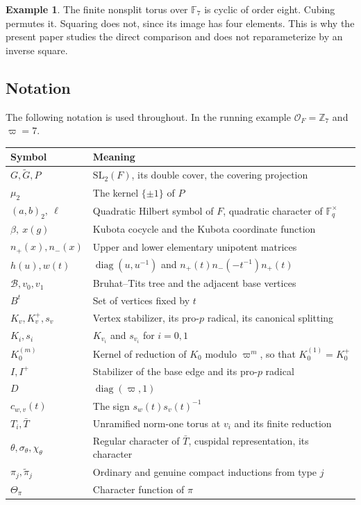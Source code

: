 \documentclass[12pt,letterpaper]{article}
\numberwithin{equation}{section}
\theoremstyle{definition}
\newtheorem{example}[theorem]{Example}
\theoremstyle{remark}
\newcommand{\OO}{\mathcal O_F}
\newcommand{\kk}{\mathbb F_q}
\newcommand{\Mp}{\widetilde G}
\newcommand{\diag}{\operatorname{diag}}
\newcommand{\BT}{\mathscr B}
\newcommand{\np}{n_{+}}
\newcommand{\nm}{n_{-}}
\begin{document}
\begin{example}
The finite nonsplit torus over $\mathbb F_7$ is cyclic of order eight. Cubing permutes it. Squaring does not, since its image has four elements. This is why the present paper studies the direct comparison and does not reparameterize by an inverse square.
\end{example}

\subsection{Notation}
The following notation is used throughout. In the running example $\OO=\mathbb Z_7$ and $\varpi=7$.
\begin{center}
\begin{tabular}{@{}lp{}@{}}
\toprule
Symbol & Meaning\\ \midrule
$G,\Mp,P$ & $\mathrm{SL}_2(F)$, its double cover, the covering projection\\
$\mu_2$ & The kernel $\{\pm1\}$ of $P$\\
$(a,b)_2,\ \ell$ & Quadratic Hilbert symbol of $F$, quadratic character of $\kk^\times$\\
$\beta,\ x(g)$ & Kubota cocycle and the Kubota coordinate function\\
$\np(x),\nm(x)$ & Upper and lower elementary unipotent matrices\\
$h(u),w(t)$ & $\diag(u,u^{-1})$ and $\np(t)\nm(-t^{-1})\np(t)$\\
$\BT,v_0,v_1$ & Bruhat--Tits tree and the adjacent base vertices\\
$B^t$ & Set of vertices fixed by $t$\\
$K_v,K_v^+,s_v$ & Vertex stabilizer, its pro-$p$ radical, its canonical splitting\\
$K_i,s_i$ & $K_{v_i}$ and $s_{v_i}$ for $i=0,1$\\
$K_0^{(m)}$ & Kernel of reduction of $K_0$ modulo $\varpi^m$, so that $K_0^{(1)}=K_0^+$\\
$I,I^+$ & Stabilizer of the base edge and its pro-$p$ radical\\
$D$ & $\diag(\varpi,1)$\\
$c_{w,v}(t)$ & The sign $s_w(t)s_v(t)^{-1}$\\
$T_i,\bar T$ & Unramified norm-one torus at $v_i$ and its finite reduction\\
$\theta,\sigma_\theta,\chi_\theta$ & Regular character of $\bar T$, cuspidal representation, its character\\
$\pi_j,\widetilde\pi_j$ & Ordinary and genuine compact inductions from type $j$\\
$\Theta_\pi$ & Character function of $\pi$\\
\bottomrule
\end{tabular}
\end{center}
\end{document}
